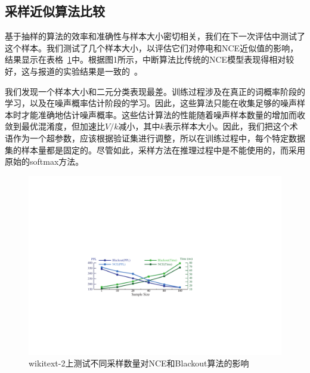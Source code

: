\subsection{采样近似算法比较}

基于抽样的算法的效率和准确性与样本大小密切相关，我们在下一次评估中测试了这个样本。我们测试了几个样本大小，以评估它们对停电和NCE近似值的影响，结果显示在表格~\ref{fig:blackout_nce}中。根据图1所示，中断算法比传统的NCE模型表现得相对较好，这与报道的实验结果是一致的~\cite{DBLP:journals/iclr/JiVSAD15}。


我们发现一个样本大小和二元分类表现最差。训练过程涉及在真正的词概率阶段的学习，以及在噪声概率估计阶段的学习。因此，这些算法只能在收集足够的噪声样本时才能准确地估计噪声概率。这些估计算法的性能随着噪声样本数量的增加而收敛到最优混淆度，但加速比$ V / k $减小，其中$ k $表示样本大小。因此，我们把这个术语作为一个超参数，应该根据验证集进行调整，所以在训练过程中，每个特定数据集的样本量都是固定的。尽管如此，采样方法在推理过程中是不能使用的，而采用原始的softmax方法。
\begin{figure}[!ht]
  \centering
  \includegraphics[width=0.9\columnwidth]{./figures/nce_blackout.pdf}
  \caption{wikitext-2上测试不同采样数量对NCE和Blackout算法的影响}\label{fig:blackout_nce}
\end{figure}

